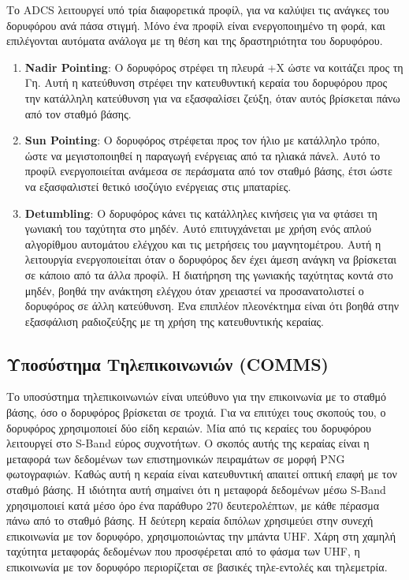 \documentclass[a4paper,nobib,justified]{tufte-book}
\begin{document}
Το \acs{ADCS} λειτουργεί υπό τρία διαφορετικά προφίλ, για να καλύψει τις ανάγκες του δορυφόρου ανά πάσα στιγμή. Μόνο ένα προφίλ είναι ενεργοποιημένο τη φορά, και επιλέγονται αυτόματα ανάλογα με τη θέση και της δραστηριότητα του δορυφόρου.
\begin{enumerate}
    \item \textbf{Nadir Pointing}: Ο δορυφόρος στρέφει τη πλευρά +X ώστε να κοιτάζει προς τη Γη. Αυτή η κατεύθυνση στρέφει την κατευθυντική κεραία του δορυφόρου προς την κατάλληλη κατεύθυνση για να εξασφαλίσει ζεύξη, όταν αυτός βρίσκεται πάνω από τον σταθμό βάσης. 
    \item \textbf{Sun Pointing}: Ο δορυφόρος στρέφεται προς τον ήλιο με κατάλληλο τρόπο, ώστε να μεγιστοποιηθεί η παραγωγή ενέργειας από τα ηλιακά πάνελ. Αυτό το προφίλ ενεργοποιείται ανάμεσα σε περάσματα από τον σταθμό βάσης, έτσι ώστε να εξασφαλιστεί θετικό ισοζύγιο ενέργειας στις μπαταρίες.
    \item \textbf{Detumbling}: Ο δορυφόρος κάνει τις κατάλληλες κινήσεις για να φτάσει τη γωνιακή του ταχύτητα στο μηδέν. Αυτό επιτυγχάνεται με χρήση ενός απλού αλγορίθμου αυτομάτου ελέγχου και τις μετρήσεις του μαγνητομέτρου. Αυτή η λειτουργία ενεργοποιείται όταν ο δορυφόρος δεν έχει άμεση ανάγκη να βρίσκεται σε κάποιο από τα άλλα προφίλ. Η διατήρηση της γωνιακής ταχύτητας κοντά στο μηδέν, βοηθά την ανάκτηση ελέγχου όταν χρειαστεί να προσανατολιστεί ο δορυφόρος σε άλλη κατεύθυνση. Ένα επιπλέον πλεονέκτημα είναι ότι βοηθά στην εξασφάλιση ραδιοζεύξης με τη χρήση της κατευθυντικής κεραίας.
\end{enumerate}
\subsection{Υποσύστημα Τηλεπικοινωνιών (\acs{COMMS})}
Το υποσύστημα τηλεπικοινωνιών είναι υπεύθυνο για την επικοινωνία με το σταθμό βάσης, όσο ο δορυφόρος βρίσκεται σε τροχιά. Για να επιτύχει τους σκοπούς του, ο δορυφόρος χρησιμοποιεί δύο είδη κεραιών. Μία από τις κεραίες του δορυφόρου λειτουργεί στο S-Band εύρος συχνοτήτων. Ο σκοπός αυτής της κεραίας είναι η μεταφορά των δεδομένων των επιστημονικών πειραμάτων σε μορφή PNG φωτογραφιών. Καθώς αυτή η κεραία είναι κατευθυντική απαιτεί οπτική επαφή με τον σταθμό βάσης. Η ιδιότητα αυτή σημαίνει ότι η μεταφορά δεδομένων μέσω S-Band χρησιμοποιεί κατά μέσο όρο ένα παράθυρο 270 δευτερολέπτων, με κάθε πέρασμα πάνω από το σταθμό βάσης. Η δεύτερη κεραία διπόλων χρησιμεύει στην συνεχή επικοινωνία με τον δορυφόρο, χρησιμοποιώντας την μπάντα UHF. Χάρη στη χαμηλή ταχύτητα μεταφοράς δεδομένων που προσφέρεται από το φάσμα των UHF, η επικοινωνία με τον δορυφόρο περιορίζεται σε βασικές τηλε-εντολές και τηλεμετρία. 
\end{document}
